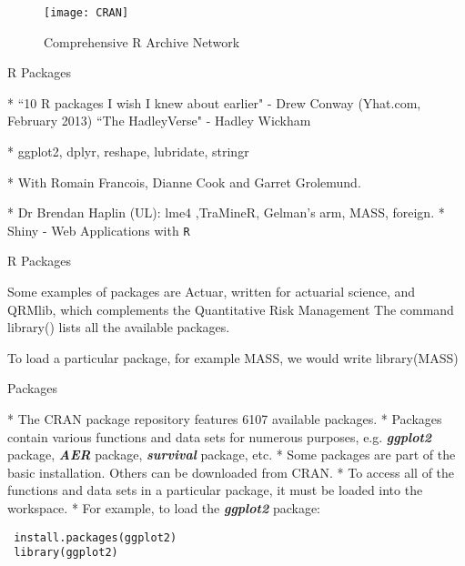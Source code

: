 \documentclass{beamer}
\begin{document}
 
 
 
 \begin{figure}
 \centering
 \texttt{[image: CRAN]}
 \caption{Comprehensive R Archive Network}
 
 \end{figure}
 
 
 
 
 
 
{R Packages}
 
 
 *  ``10 R packages I wish I knew about earlier" - Drew Conway (Yhat.com, February 2013)
 \bigskip *  ``The HadleyVerse" - Hadley Wickham
 
 
 *   ggplot2, dplyr, reshape, lubridate, stringr
 
 *   With Romain Francois, Dianne Cook and Garret Grolemund.

 \bigskip
 *  Dr Brendan Haplin (UL): lme4 ,TraMineR, Gelman's arm, MASS, foreign. 
 \bigskip
 *  Shiny - Web Applications with \texttt{R}

 
 
{R Packages}
 
 
 
 
 Some examples of packages are Actuar, written for actuarial science, and
 QRMlib, which complements the Quantitative Risk Management The command library()
 lists all the available packages. 
 
 To load a particular package, for example MASS, we would
 write
 library(MASS)
 
 
 
 
{Packages}
 
 *  The CRAN package repository features 6107 available packages. 
 *  Packages contain
 various functions and data sets for numerous purposes, e.g.
 \textbf{\textit{ggplot2}} package, \textbf{\textit{AER}} package, \textbf{\textit{survival}} package, etc.
 *  Some packages are part of the basic installation. Others can be
 downloaded from CRAN.
 *  To access all of the functions and data sets in a particular package,
 it must be loaded into the workspace. 
 *  For example, to load the
 \textbf{\textit{ggplot2}} package:

 \begin{framed}
 \begin{verbatim}
 install.packages(ggplot2)
 library(ggplot2)
 \end{verbatim}
 \end{framed}
 
\end{document}
